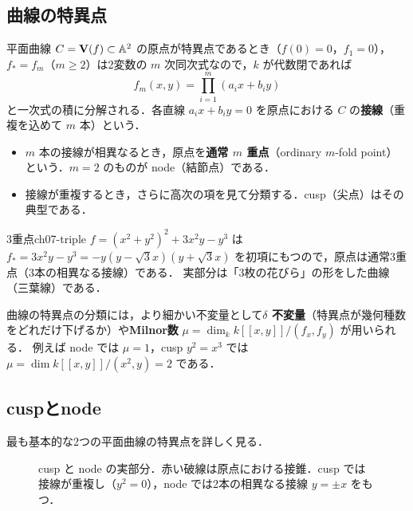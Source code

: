 \subsection{曲線の特異点}

平面曲線 $C=\mathbf{V}(f)\subset\mathbb{A}^2$ の原点が特異点であるとき（$f(0)=0$，$f_1=0$），$f_*=f_m$（$m\ge2$）は2変数の $m$ 次同次式なので，$k$ が代数閉であれば
\[
  f_m(x,y)=\prod_{i=1}^m(a_ix+b_iy)
\]
と一次式の積に分解される．各直線 $a_ix+b_iy=0$ を原点における $C$ の\textbf{接線}（重複を込めて $m$ 本）という．
\begin{itemize}
  \item $m$ 本の接線が相異なるとき，原点を\textbf{通常 $m$ 重点}（ordinary $m$-fold point）という．$m=2$ のものが node（結節点）である．
  \item 接線が重複するとき，さらに高次の項を見て分類する．cusp（尖点）はその典型である．
\end{itemize}

\begin{myex}{3重点}{ch07-triple}
$f=(x^2+y^2)^2+3x^2y-y^3$ は $f_*=3x^2y-y^3=-y(y-\sqrt3x)(y+\sqrt3x)$ を初項にもつので，原点は通常3重点（3本の相異なる接線）である．
実部分は「3枚の花びら」の形をした曲線（三葉線）である．
\end{myex}

曲線の特異点の分類には，より細かい不変量として\textbf{$\delta$ 不変量}（特異点が幾何種数をどれだけ下げるか）や\textbf{Milnor数} $\mu=\dim_k k[[x,y]]/(f_x,f_y)$ が用いられる．
例えば node では $\mu=1$，cusp $y^2=x^3$ では $\mu=\dim k[[x,y]]/(x^2,y)=2$ である．

\subsection{cuspとnode}

最も基本的な2つの平面曲線の特異点を詳しく見る．

\begin{figure}[H]
\centering
{}
\caption{cusp と node の実部分．赤い破線は原点における接錐．cusp では接線が重複し（$y^2=0$），node では2本の相異なる接線 $y=\pm x$ をもつ．}
\label{fig:ch07-cusp-node}
\end{figure}

